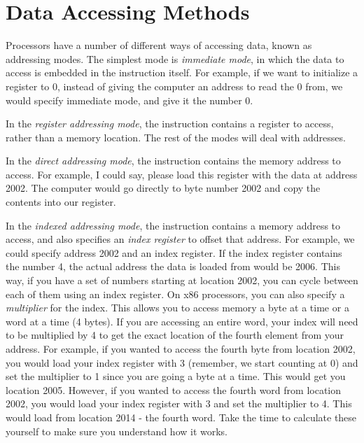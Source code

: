 \section{Data Accessing Methods}
\label{dataaccessingmethods}


Processors have a number of different ways of accessing data, known
as addressing modes.  The simplest mode is 
\emph{immediate mode}, in which the data to access is
embedded in the instruction itself.  For example, if we want to initialize
a register to 0, instead of giving the computer an address to read the
0 from, we would specify immediate mode, and give it the number 0.

In the \emph{register addressing mode},
the instruction contains a register to access, rather than a memory location.
The rest of the modes will deal with addresses.

In the \emph{direct addressing mode}, the instruction contains
the memory address to access.  For example, I could say, please load
this register with the data at address 2002.  The computer would go
directly to byte number 2002 and copy the contents into our register.

In the \emph{indexed addressing mode}, the instruction contains
a memory address to access, and also specifies an \emph{index register} to offset that address.  For example, we could specify
address 2002 and an index register.  If the index register contains the
number 4, the actual address the data is loaded from would be 2006.  This
way, if you have a set of numbers starting at location 2002, you can cycle
between each of them using an index register.  On x86 processors, you can
also specify a \emph{multiplier} for the index.  This allows you to access
memory a byte at a time or a word at a time (4 bytes).  If you are accessing
an entire word, your index will need to be multiplied by 4 to get the exact
location of the fourth element from your address.  For example, if you wanted
to access the fourth byte from location 2002, you would load your index
register with 3 (remember, we start counting at 0) and set the multiplier
to 1 since you are going a byte at a time.  This would get you location
2005.  However, if you wanted to access the fourth word from location 2002,
you would load your index register with 3 and set the multiplier to 4. 
This would load from location 2014 - the fourth word.  Take the time to 
calculate these yourself to make sure you understand how it works.

